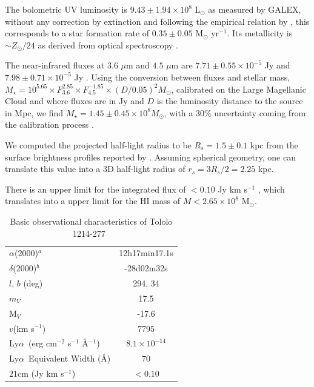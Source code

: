 \documentclass[a4,useAMS,usenatbib,usegraphicx]{mn2e}
\newcommand{\tol}{Tololo 1214-277}
\newcommand{\lya}{Ly$\alpha$}
\begin{document}
The bolometric UV luminosity is $9.43\pm1.94 \times 10^{8}$
L$_{\odot}$ as measured by GALEX, without any correction by extinction
and following the empirical relation by \cite{Kennicutt98}, this
corresponds to a star formation rate of $0.35\pm 0.05$ M$_{\odot}$
yr$^{-1}$. 
Its metallicity is $\sim Z_{\odot}/24$ as derived from
optical spectroscopy \citep{Izotov04}. 

%


The near-infrared fluxes at $3.6$ $\mu$m and $4.5$ $\mu$m are
$7.71\pm0.55\times 10^{-5}$ Jy and $7.98\pm0.71\times 10^{-5}$ Jy
\citep{2008ApJ...678..804E}.
Using the conversion between fluxes and
stellar mass, $M_{\star} =
10^{5.65} \times F_{3.6}^{2.85} \times F_{4.5}^{-1.85} \times
(D/0.05)^2 M_{\odot}$,  calibrated on the Large Magellanic Cloud 
and  where fluxes are in Jy and $D$ is the luminosity
distance to the source in Mpc, we find $M_{\star} = 1.45\pm0.45\times 10^{8}
M_{\odot}$, with a $30\%$ uncertainty coming from the calibration
process \citep{2012AJ....143..139E}.  

We computed the projected half-light radius to be $R_s=1.5\pm0.1$ kpc 
from the surface brightness profiles reported by \cite{2003A&A...410..481N}. 
Assuming spherical geometry, one can translate this value into a 3D
half-light radius of $r_s=3R_s/2=2.25$ kpc.

There is an upper limit for the  
integrated flux of $<0.10$ Jy km s$^{-1}$ \citep{pustilnikmartin07},
which translates into a upper limit for the HI mass of $M<2.65\times
10^{8}$ M$_{\odot}$. 




\begin{table}
\begin{center}
\begin{tabular}{lc}\hline
$\alpha$(2000)$^{a}$ & 12h17min17.1s\\
$\delta$(2000)$^{b}$ & -28d02m32s\\
$l$, $b$ (deg) & 294, 34\\
$m_V$ & 17.5\\
  M$_V$ & -17.6\\ 
$v$(km s$^{-1}$) & 7795\\
\lya\ (erg cm$^{-2}$ s$^{-1}$ \AA$^{-1}$)& $8.1\times 10^{-14}$ \\
\lya\ Equivalent Width (\AA) & $70$\\
$21$cm (Jy km s$^{-1}$)& $<0.10$ \\\hline
\end{tabular}
\end{center}
\caption{Basic observational characteristics of \tol\ 
  \citep{Thuan97}\label{obstable}} 
\end{table}
\end{document}
